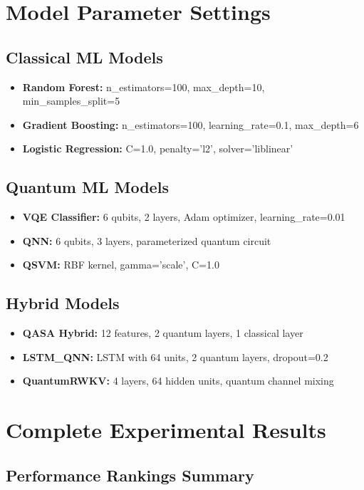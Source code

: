 \documentclass[12pt,a4paper]{article}
\begin{document}
\section{Model Parameter Settings}

\subsection{Classical ML Models}
\begin{itemize}
    \item \textbf{Random Forest:} n\_estimators=100, max\_depth=10, min\_samples\_split=5
    \item \textbf{Gradient Boosting:} n\_estimators=100, learning\_rate=0.1, max\_depth=6
    \item \textbf{Logistic Regression:} C=1.0, penalty='l2', solver='liblinear'
\end{itemize}

\subsection{Quantum ML Models}
\begin{itemize}
    \item \textbf{VQE Classifier:} 6 qubits, 2 layers, Adam optimizer, learning\_rate=0.01
    \item \textbf{QNN:} 6 qubits, 3 layers, parameterized quantum circuit
    \item \textbf{QSVM:} RBF kernel, gamma='scale', C=1.0
\end{itemize}

\subsection{Hybrid Models}
\begin{itemize}
    \item \textbf{QASA Hybrid:} 12 features, 2 quantum layers, 1 classical layer
    \item \textbf{LSTM\_QNN:} LSTM with 64 units, 2 quantum layers, dropout=0.2
    \item \textbf{QuantumRWKV:} 4 layers, 64 hidden units, quantum channel mixing
\end{itemize}

\section{Complete Experimental Results}

\subsection{Performance Rankings Summary}
\end{document}
